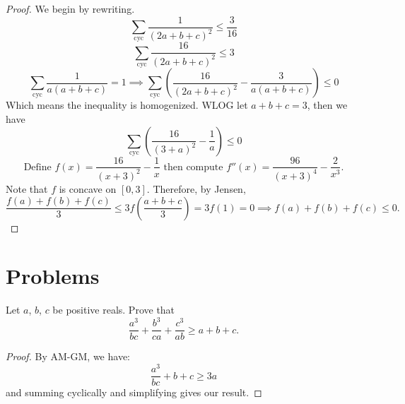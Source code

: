 \documentclass[11pt]{scrartcl}
\begin{document}
\begin{proof}
  We begin by rewriting.
  \[
  \sum_{\text{cyc}} \frac{1}{(2a+b+c)^2} \le \frac{3}{16}
  \]
  \[
  \sum_{\text{cyc}} \frac{16}{(2a+b+c)^2} \le 3
  \]
  \[
  \sum_{\text{cyc}} \frac{1}{a(a+b+c)} = 1 \implies \sum_{\text{cyc}} \left( \frac{16}{(2a+b+c)^2} - \frac{3}{a(a+b+c)} \right) \le 0
  \]
  Which means the inequality is homogenized. WLOG let $a + b + c = 3$, then we have
  \[
  \sum_{\text{cyc}} \left( \frac{16}{(3+a)^2} - \frac1a \right) \le 0
  \]
  \[
  \text{Define } f(x) = \frac{16}{(x+3)^2} - \frac1x \text{ then compute } f''(x) = \frac{96}{(x+3)^4} - \frac{2}{x^3}.
  \]
  Note that $f$ is concave on $[0, 3]$. Therefore, by Jensen,
  \[
  \frac{f(a) + f(b) + f(c)}{3} \le 3f\left(\frac{a+b+c}{3}\right) = 3f(1) = 0 \implies \boxed{f(a) + f(b) + f(c) \le 0}.
  \]
\end{proof}

\newpage{}

\section{Problems}

\begin{problem}
   Let $a$, $b$, $c$ be positive reals. Prove that
  \[
  \frac{a^3}{bc} + \frac{b^3}{ca} + \frac{c^3}{ab} \ge a + b + c.
  \]
\end{problem}

\begin{proof}
  By AM-GM, we have:
  \[
  \frac{a^3}{bc} + b + c \ge 3a
  \]
  and summing cyclically and simplifying gives our result.
\end{proof}
\end{document}
